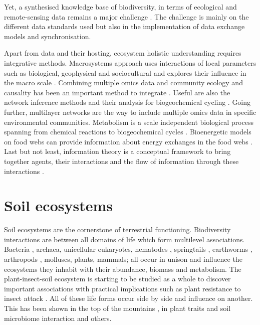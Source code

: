Yet, a synthesised knowledge base of biodiversity, in terms of ecological and
remote-sensing data remains a major challenge \parencite{feng2022Review}. The challenge
is mainly on the different data standards used but also in the implementation of 
data exchange models and synchronisation.

Apart from data and their hosting, ecosystem holistic understanding requires
integrative methods. Macrosystems approach uses interactions of local parameters
such as biological, geophysical and sociocultural and explores their influence in
the macro scale \parencite{heffernan2014}. Combining multiple omics data and community ecology and causality has
been an important method to integrate \parencite{jurburg2022community}. Useful are also the network inference methods 
and their analysis for biogeochemical cycling \parencite{jameson2023Network}. Going further, multilayer networks \parencite{marine-multilayers}
are the way to include multiple omics data in specific environmental communities. 
Metabolism is a scale independent biological process spanning from chemical reactions
to biogeochemical cycles \parencite{hall2018understanding}. Bioenergetic models on food 
webs can provide information about energy exchanges in the food webs \parencite{valdovinos2023bioenergetic}.
Last but not least, information theory is a conceptual framework to bring together agents,
their interactions and the flow of information through these interactions \parencite{oconnor-information-ecology}.

\section{Soil ecosystems}
\label{sec:soil_ecosystems}

Soil ecosystems are the cornerstone of terrestrial functioning.
Biodiversity interactions are between all domains of life which form
multilevel associations. Bacteria \parencite{Delgado-Baquerizo-atlas}, archaea,
unicellular eukaryotes, nematodes \parencite{vandenHoogen2019},
springtails \parencite{potapov2023Globally}, earthworms \parencite{Phillips2021},
arthropods \parencite{milo-arthropods}, molluscs, plants, mammals; all occur in unison and 
influence the ecosystems they inhabit with their abundance, biomass \parencite{bar2018biomass} and metabolism.
The plant-insect-soil ecosystem is starting to be studied as a whole to discover
important associations with practical implications such as plant resistance 
to insect attack \parencite{plant-insect-soil2023}.
All of these life forms occur side by side and influence on another. This has been shown in the 
top of the mountains \parencite{winkler2018side}, in plant traits and soil microbiome interaction \parencite{beugnon2022Abiotic} and others. 

